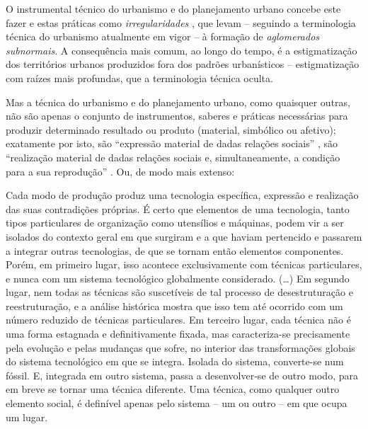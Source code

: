 O instrumental técnico do urbanismo e do planejamento urbano concebe este fazer e estas práticas como \textit{irregularidades} \cite[p.~181-210]{ROLNIK2007}, que levam – seguindo a terminologia técnica do urbanismo atualmente em vigor – à formação de \textit{aglomerados subnormais}. A consequência mais comum, ao longo do tempo, é a estigmatização dos territórios urbanos produzidos fora dos padrões urbanísticos – estigmatização com raízes mais profundas, que a terminologia técnica oculta.

Mas a técnica do urbanismo e do planejamento urbano, como quaisquer outras, não são apenas o conjunto de instrumentos, saberes e práticas necessárias para produzir determinado resultado ou produto (material, simbólico ou afetivo); exatamente por isto, são ``expressão material de dadas relações sociais'' \cite[p.~266]{BERNARDO1977c}, são ``realização material de dadas relações sociais e, simultaneamente, a condição para a sua reprodução'' \cite[p.~285]{BERNARDO1977c}. Ou, de modo mais extenso:

\begin{citacao}
Cada modo de produção produz uma tecnologia específica, expressão e realização das suas contradições próprias. É certo que elementos de uma tecnologia, tanto tipos particulares de organização como utensílios e máquinas, podem vir a ser isolados do contexto geral em que surgiram e a que haviam pertencido e passarem a integrar outras tecnologias, de que se tornam então elementos componentes. Porém, em primeiro lugar, isso acontece exclusivamente com técnicas particulares, e nunca com um sistema tecnológico globalmente considerado. (…) Em segundo lugar, nem todas as técnicas são suscetíveis de tal processo de desestruturação e reestruturação, e a análise histórica mostra que isso tem até ocorrido com um número reduzido de técnicas particulares. Em terceiro lugar, cada técnica não é uma forma estagnada e definitivamente fixada, mas caracteriza-se precisamente pela evolução e pelas mudanças que sofre, no interior das transformações globais do sistema tecnológico em que se integra. Isolada do sistema, converte-se num fóssil. E, integrada em outro sistema, passa a desenvolver-se de outro modo, para em breve se tornar uma técnica diferente. Uma técnica, como qualquer outro elemento social, é definível apenas pelo sistema – um ou outro – em que ocupa um lugar. \cite[p.~312]{BERNARDO1991}
\end{citacao}

